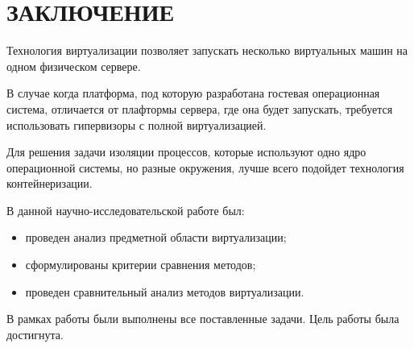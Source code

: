 \chapter*{ЗАКЛЮЧЕНИЕ}
Технология виртуализации позволяет запускать несколько виртуальных машин на одном физическом сервере.

В случае когда платформа, под которую разработана гостевая операционная система, отличается от плафтормы сервера, где она будет запускать, требуется использовать гипервизоры с полной виртуализацией.

Для решения задачи изоляции процессов, которые используют одно ядро операционной системы, но разные окружения, лучше всего подойдет технология контейнеризации.

В данной научно-исследовательской работе был:
\begin{itemize}
	\item проведен анализ предметной области виртуализации;
	\item сформулированы критерии сравнения методов;
	\item проведен сравнительный анализ методов виртуализации.
\end{itemize}

В рамках работы были выполнены все поставленные задачи. Цель работы была достигнута.
